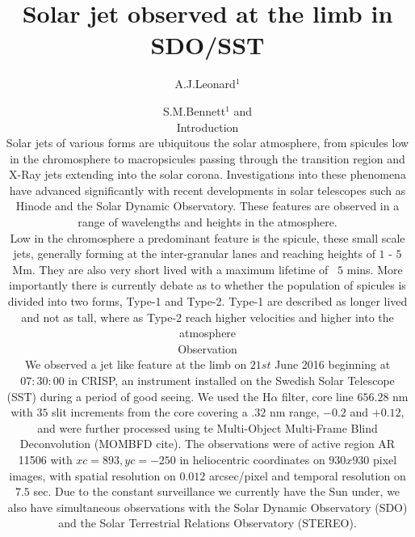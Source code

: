 \documentclass{emulateapj}
\begin{document}
\title{Solar jet observed at the limb in SDO/SST}
\author{S.M.Bennett$^1$
and
\author{A.J.Leonard$^1$}


\begin{abstract}
\end{abstract}

\maketitle

\section{Introduction}
Solar jets of various forms are ubiquitous the solar atmosphere, from spicules low in the chromosphere to macropsicules passing through the transition region and X-Ray jets extending into the solar corona. 
Investigations into these phenomena have advanced significantly with recent developments in solar telescopes such as Hinode and the Solar Dynamic Observatory.
These features are observed in a range of wavelengths and heights in the atmosphere. 

Low in the chromosphere a predominant feature is the spicule, these small scale jets, generally forming at the inter-granular lanes and reaching heights of $1$ - $5$ Mm.
They are also very short lived with a maximum lifetime of ~$5$ mins.
More importantly there is currently debate as to whether the population of spicules is divided into two forms, Type-1 and Type-2. 
Type-1 are described as longer lived and not as tall, where as Type-2 reach higher velocities and higher into the atmosphere





\section{Observation}
We observed a jet like feature at the limb on $21st$ June 2016 beginning at $07:30:00$ in CRISP, an instrument installed on the Swedish Solar Telescope (SST) during a period of good seeing. %
We used the H$\alpha$ filter, core line $656.28$ nm with $35$ slit increments from the core covering a $.32$ nm range, $-0.2$ and $+0.12$, and were further processed using te Multi-Object Multi-Frame Blind Deconvolution (MOMBFD cite). %
The observations were of active region AR 11506 with $xc = 893, yc = -250$ in heliocentric coordinates on $930x930$ pixel images, with spatial resolution on $0.012$ arcsec/pixel and temporal resolution on $7.5$ sec.
Due to the constant surveillance we currently have the Sun under, we also have simultaneous observations with the Solar Dynamic Observatory (SDO) and the Solar Terrestrial Relations Observatory (STEREO).

}
\end{document}

